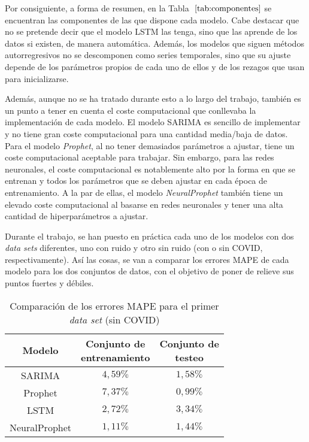 \documentclass[12pt,twoside]{article}
\begin{document}
Por consiguiente, a forma de resumen, en la Tabla $~\ref{tab:componentes}$ se encuentran las componentes de las que dispone cada modelo. Cabe destacar que no se pretende decir que el modelo LSTM las tenga, sino que las aprende de los datos si existen, de manera automática. Además, los modelos que siguen métodos autorregresivos no se descomponen como series temporales, sino que su ajuste depende de los parámetros propios de cada uno de ellos y de los rezagos que usan para inicializarse.

Además, aunque no se ha tratado durante esto a lo largo del trabajo, también es un punto a tener en cuenta el coste computacional que conllevaba la implementación de cada modelo. El modelo SARIMA es sencillo de implementar y no tiene gran coste computacional para una cantidad media/baja de datos. Para el modelo \textit{Prophet}, al no tener demasiados parámetros a ajustar, tiene un coste computacional aceptable para trabajar. Sin embargo, para las redes neuronales, el coste computacional es notablemente alto por la forma en que se entrenan y todos los parámetros que se deben ajustar en cada época de entrenamiento. A la par de ellas, el modelo \textit{NeuralProphet} también tiene un elevado coste computacional al basarse en redes neuronales y tener una alta cantidad de hiperparámetros a ajustar.

Durante el trabajo, se han puesto en práctica cada uno de los modelos con dos \textit{data sets} diferentes, uno con ruido y otro sin ruido (con o sin COVID, respectivamente). Así las cosas, se van a comparar los errores MAPE de cada modelo para los dos conjuntos de datos, con el objetivo de poner de relieve sus puntos fuertes y débiles.

\begin{table}[h]
\centering
\begin{tabular}{|c|c|c|}
\hline
\textbf{Modelo} & \makecell{\textbf{Conjunto de} \\ \textbf{entrenamiento}} & \makecell{\textbf{Conjunto de} \\ \textbf{testeo}} \\ \hline
SARIMA & $4,59\%$ & $1,58\%$  \\ \hline
Prophet & $7,37\%$ & $0,99\%$ \\ \hline
LSTM & $2,72\%$ & $3,34\%$ \\ \hline
NeuralProphet & $1,11\%$ & $1,44\%$ \\ \hline
\end{tabular}
\caption{Comparación de los errores MAPE para el primer \textit{data set} (sin COVID)}
\label{tab:comparacion1}
\end{table}
\end{document}
